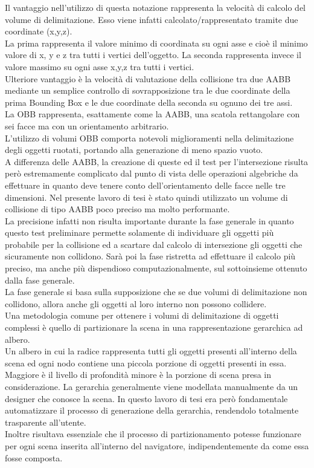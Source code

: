 Il vantaggio nell’utilizzo di questa notazione rappresenta la velocità di calcolo del volume di delimitazione. Esso viene infatti calcolato/rappresentato tramite due coordinate (x,y,z).
\\
La prima rappresenta il valore minimo di coordinata su ogni asse e cioè il minimo valore di x, y e z tra tutti i vertici dell’oggetto. La seconda rappresenta invece il valore massimo su ogni asse x,y,z tra tutti i vertici.
\\
Ulteriore vantaggio è la velocità di valutazione della collisione tra due AABB mediante un semplice controllo di sovrapposizione tra le due coordinate della prima Bounding Box e le due coordinate della seconda su ognuno dei tre assi.
\\

La OBB rappresenta, esattamente come la AABB, una scatola rettangolare con sei facce ma con un orientamento arbitrario.
\\
L’utilizzo di volumi OBB comporta notevoli miglioramenti nella delimitazione degli oggetti ruotati, portando alla generazione di meno spazio vuoto.
\\
A differenza delle AABB, la creazione di queste ed il test per l’intersezione risulta però estremamente complicato dal punto di vista delle operazioni algebriche da effettuare in quanto deve tenere conto dell’orientamento delle facce nelle tre dimensioni.
Nel presente lavoro di tesi è stato quindi utilizzato un volume di collisione di tipo AABB poco preciso ma molto performante.
\\
La precisione infatti non risulta importante durante la fase generale in quanto questo test preliminare permette solamente di individuare gli oggetti più probabile per la collisione ed a scartare dal calcolo di intersezione gli oggetti che sicuramente non collidono. Sarà poi la fase ristretta ad effettuare il calcolo più preciso, ma anche più dispendioso computazionalmente, sul sottoinsieme ottenuto dalla fase generale.
\\
La fase generale si basa sulla supposizione che se due volumi di delimitazione non collidono, allora anche gli oggetti al loro interno non possono collidere.
\\
Una metodologia comune per ottenere i volumi di delimitazione di oggetti complessi è quello di partizionare la scena in una rappresentazione gerarchica ad albero.
\\
Un albero in cui la radice rappresenta tutti gli oggetti presenti all’interno della scena ed ogni nodo contiene una piccola porzione di oggetti presenti in essa.
\\
Maggiore è il livello di profondità minore è la porzione di scena presa in considerazione.
La gerarchia generalmente viene modellata manualmente da un designer che conosce la scena. In questo lavoro di tesi era però fondamentale automatizzare il processo di generazione della gerarchia, rendendolo totalmente trasparente all’utente.
\\
Inoltre risultava essenziale che il processo di partizionamento potesse funzionare per ogni scena inserita all’interno del navigatore, indipendentemente da come essa fosse composta.
\\

